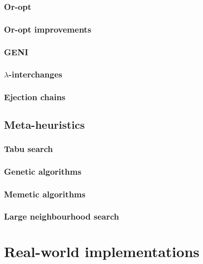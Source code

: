 \subsubsection{Or-opt}

\subsubsection{Or-opt improvements}

\subsubsection{GENI}

\subsubsection{$\lambda$-interchanges}

\subsubsection{Ejection chains}


\subsection{Meta-heuristics}

\subsubsection{Tabu search}

\subsubsection{Genetic algorithms}

\subsubsection{Memetic algorithms}

\subsubsection{Large neighbourhood search}


\section{Real-world implementations}





